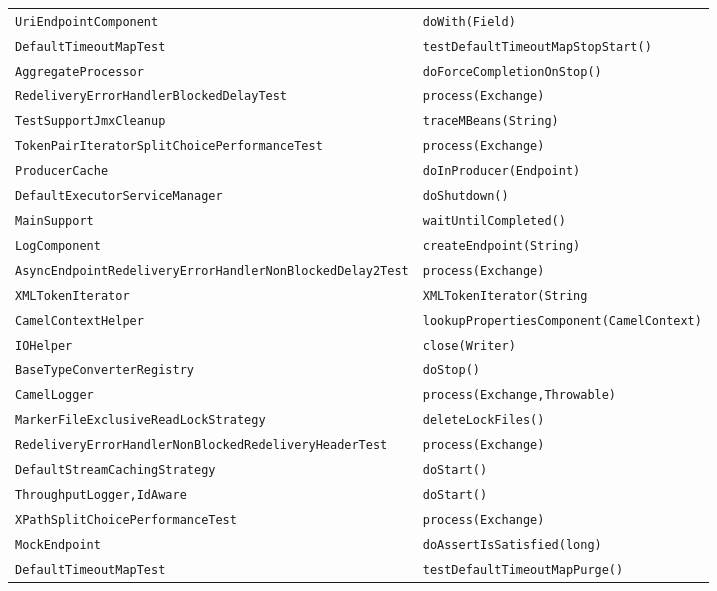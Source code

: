 \begin{center}
\begin{longtable}{ll}
\lstinline/UriEndpointComponent/&{\lstinline/doWith(Field)/}\\
\lstinline/DefaultTimeoutMapTest/&{\lstinline/testDefaultTimeoutMapStopStart()/}\\
\lstinline/AggregateProcessor/&{\lstinline/doForceCompletionOnStop()/}\\
\lstinline/RedeliveryErrorHandlerBlockedDelayTest/&{\lstinline/process(Exchange)/}\\
\lstinline/TestSupportJmxCleanup/&{\lstinline/traceMBeans(String)/}\\
\lstinline/TokenPairIteratorSplitChoicePerformanceTest/&{\lstinline/process(Exchange)/}\\
\lstinline/ProducerCache/&{\lstinline/doInProducer(Endpoint)/}\\
\lstinline/DefaultExecutorServiceManager/&{\lstinline/doShutdown()/}\\
\lstinline/MainSupport/&{\lstinline/waitUntilCompleted()/}\\
\lstinline/LogComponent/&{\lstinline/createEndpoint(String)/}\\
\lstinline/AsyncEndpointRedeliveryErrorHandlerNonBlockedDelay2Test/&{\lstinline/process(Exchange)/}\\
\lstinline/XMLTokenIterator/&{\lstinline/XMLTokenIterator(String/}\\
\lstinline/CamelContextHelper/&{\lstinline/lookupPropertiesComponent(CamelContext)/}\\
\lstinline/IOHelper/&{\lstinline/close(Writer)/}\\
\lstinline/BaseTypeConverterRegistry/&{\lstinline/doStop()/}\\
\lstinline/CamelLogger/&{\lstinline/process(Exchange,Throwable)/}\\
\lstinline/MarkerFileExclusiveReadLockStrategy/&{\lstinline/deleteLockFiles()/}\\
\lstinline/RedeliveryErrorHandlerNonBlockedRedeliveryHeaderTest/&{\lstinline/process(Exchange)/}\\
\lstinline/DefaultStreamCachingStrategy/&{\lstinline/doStart()/}\\
\lstinline/ThroughputLogger,IdAware/&{\lstinline/doStart()/}\\
\lstinline/XPathSplitChoicePerformanceTest/&{\lstinline/process(Exchange)/}\\
\lstinline/MockEndpoint/&{\lstinline/doAssertIsSatisfied(long)/}\\
\lstinline/DefaultTimeoutMapTest/&{\lstinline/testDefaultTimeoutMapPurge()/}\\

\end{longtable}
\end{center}
